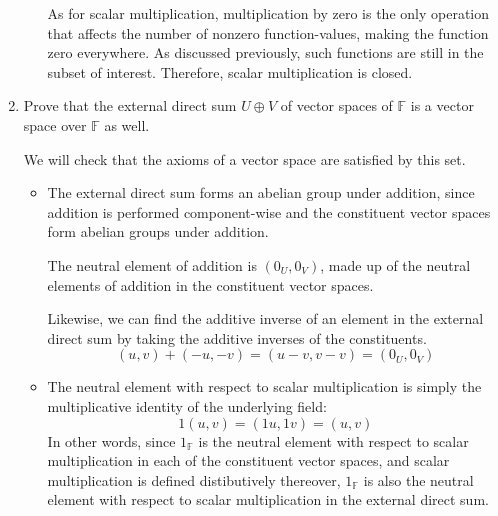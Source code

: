 \documentclass{article}
\newcommand{\F}{\mathbb{F}}
\begin{document}
\begin{enumerate}
\begin{enumerate}
                As for scalar multiplication, multiplication by zero is the
                only operation that affects the number of nonzero
                function-values, making the function zero everywhere. As
                discussed previously, such functions are still in the subset of
                interest. Therefore, scalar multiplication is closed.
        \end{enumerate}

    \item Prove that the external direct sum $U \oplus V$ of vector spaces of
        $\F$ is a vector space over $\F$ as well.

        We will check that the axioms of a vector space are satisfied by this
        set.

        \begin{itemize}
            \item The external direct sum forms an abelian group under
                addition, since addition is performed component-wise and the
                constituent vector spaces form abelian groups under addition.

                The neutral element of addition is $(0_U, 0_V)$, made up of
                the neutral elements of addition in the constituent vector
                spaces.

                Likewise, we can find the additive inverse of an element in the
                external direct sum by taking the additive inverses of the
                constituents.
                \begin{equation*}
                    (u, v) + (-u, -v) = (u - v, v - v) = (0_U, 0_V)
                \end{equation*}

            \item The neutral element with respect to scalar multiplication is
                simply the multiplicative identity of the underlying field:
                \begin{equation*}
                    1 (u, v) = (1 u, 1 v) = (u, v)
                \end{equation*}
                In other words, since $1_\F$ is the neutral element with
                respect to scalar multiplication in each of the constituent
                vector spaces, and scalar multiplication is defined
                distibutively thereover, $1_\F$ is also the neutral element
                with respect to scalar multiplication in the external direct
                sum.


\end{itemize}
\end{enumerate}
\end{document}
